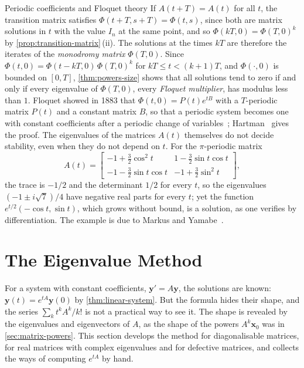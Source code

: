 \begin{note}{Periodic coefficients and Floquet theory}
If $A(t+T)=A(t)$ for all $t$, the transition matrix satisfies $\Phi(t+T,s+T)=\Phi(t,s)$, since both are matrix solutions in $t$ with the value $I_n$ at the same point, and so $\Phi(kT,0)=\Phi(T,0)^k$ by \cref{prop:transition-matrix}\,(ii). The solutions at the times $kT$ are therefore the iterates of the \emph{monodromy matrix} $\Phi(T,0)$. Since $\Phi(t,0)=\Phi(t-kT,0)\,\Phi(T,0)^k$ for $kT\le t<(k+1)T$, and $\Phi(\cdot,0)$ is bounded on $[0,T]$, \cref{thm:powers-size} shows that all solutions tend to zero if and only if every eigenvalue of $\Phi(T,0)$, every \emph{Floquet multiplier}, has modulus less than $1$. Floquet showed in 1883 that $\Phi(t,0)=P(t)e^{tB}$ with a $T$-periodic matrix $P(t)$ and a constant matrix $B$, so that a periodic system becomes one with constant coefficients after a periodic change of variables~\cite{floquet1883}; Hartman~\cite[Chap.~IV]{hartman2002} gives the proof. The eigenvalues of the matrices $A(t)$ themselves do not decide stability, even when they do not depend on $t$. For the $\pi$-periodic matrix
\[
A(t)=\begin{bmatrix}-1+\frac32\cos^2t&1-\frac32\sin t\cos t\\[2pt]-1-\frac32\sin t\cos t&-1+\frac32\sin^2t\end{bmatrix},
\]
the trace is $-1/2$ and the determinant $1/2$ for every $t$, so the eigenvalues $(-1\pm i\sqrt7)/4$ have negative real parts for every $t$; yet the function $e^{t/2}(-\cos t,\sin t)$, which grows without bound, is a solution, as one verifies by differentiation. The example is due to Markus and Yamabe~\cite[p.~310]{markus1960}.
\end{note}

\section{The Eigenvalue Method}
\label{sec:eigenvalue-method}

For a system with constant coefficients, $\mathbf y'=A\mathbf y$, the solutions are known: $\mathbf y(t)=e^{tA}\mathbf y(0)$ by \cref{thm:linear-system}. But the formula hides their shape, and the series $\sum_kt^kA^k/k!$ is not a practical way to see it. The shape is revealed by the eigenvalues and eigenvectors of $A$, as the shape of the powers $A^k\mathbf x_0$ was in \cref{sec:matrix-powers}. This section develops the method for diagonalisable matrices, for real matrices with complex eigenvalues and for defective matrices, and collects the ways of computing $e^{tA}$ by hand.

